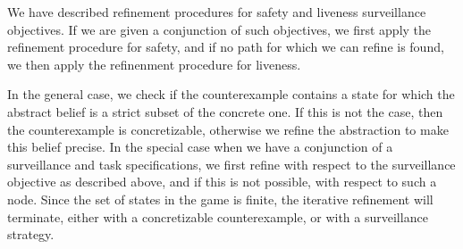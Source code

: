 We have described refinement procedures for safety and liveness surveillance objectives. If we are given a conjunction of such objectives, we first apply the refinement procedure for safety, and if no path for which we can refine is found, we then apply the refinenment procedure for liveness. 

In the general case, we check if the counterexample contains a state for which the abstract belief is a strict subset of the concrete one. If this is not the case, then the counterexample is concretizable, otherwise we refine the abstraction to make this belief precise. In the special case when we have a conjunction of a surveillance and task specifications, we first refine with respect to the surveillance objective as described above, and if this is not possible, with respect to such a node. Since the set of states in the game is finite, the iterative refinement will terminate, either with a concretizable counterexample, or with a surveillance strategy.  




